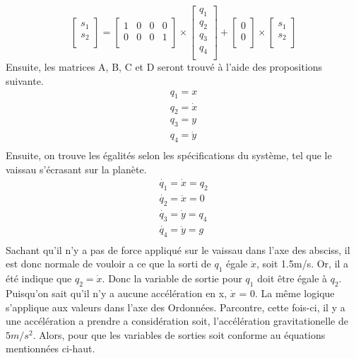 \documentclass{article}
\begin{document}
\begin{equation}
  	\begin{bmatrix}
 	s_{1} \\ 
  	s_{2} \\
  	\end{bmatrix}
  	=
  	\begin{bmatrix}
  	1 & 0 & 0 & 0 \\ 
  	0 & 0 & 0 & 1 \\
  	\end{bmatrix}
 	\times
  	\begin{bmatrix}
  	q_{1} \\ 
  	q_{2} \\ 
  	q_{3} \\ 
 	q_{4} \\
  	\end{bmatrix}
  	+
  	\begin{bmatrix}
  	0 \\ 
  	0 \\
  	\end{bmatrix}
  	\times
  	\begin{bmatrix}
  	s_{1} \\ 
  	s_{2} \\
  	\end{bmatrix}
\end{equation}
Ensuite, les matrices A, B, C et D seront trouvé à l'aide des propositions suivante.
\begin{equation}
\begin{matrix}
q_{1} = x \\ 
q_{2} = \dot{x} \\
q_{3} = y \\
q_{4} = \dot{y} \\
\end{matrix}
\end{equation}
Ensuite, on trouve les égalités selon les spécifications du système, tel que le vaissau s'écrasant sur la planète. 
\begin{equation}
\begin{matrix}
\dot{q_{1}} = \dot{x} = q_{2} \\ 
\dot{q_{2}} = \ddot{x} = 0 \\
\dot{q_{3}} = \dot{y} = q_{4} \\ 
\dot{q_{4}} = \ddot{y} = g \\
\end{matrix}
\end{equation}
Sachant qu'il n'y a pas de force appliqué sur le vaissau dans l'axe des absciss, il est donc normale de vouloir a ce que la sorti de $q_1$  égale $\dot{x}$, soit 1.5m/s. Or, il a été indique que $q_2 = \dot{x}$. Donc la variable de sortie pour $q_1$ doit être égale à $q_2$. Puisqu'on sait qu'il n'y a aucune accélération en x, $\dot{x}$ = 0. La même logique s'applique aux valeurs dans l'axe des Ordonnées. Parcontre, cette fois-ci, il y a une accélération a prendre a considération soit, l'accélération gravitationelle de $5m/s^2$. Alors, pour que les variables de sorties soit conforme au équations mentionnées ci-haut.
\end{document}
